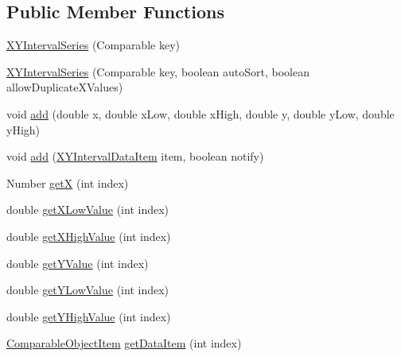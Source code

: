\subsection*{Public Member Functions}
\begin{DoxyCompactItemize}
\item 
\mbox{\hyperlink{classorg_1_1jfree_1_1data_1_1xy_1_1_x_y_interval_series_a13d7c25b678591c336fe3552e7c6fc99}{X\+Y\+Interval\+Series}} (Comparable key)
\item 
\mbox{\hyperlink{classorg_1_1jfree_1_1data_1_1xy_1_1_x_y_interval_series_a0b1ff8ece95aa620538c35f517aa6cbd}{X\+Y\+Interval\+Series}} (Comparable key, boolean auto\+Sort, boolean allow\+Duplicate\+X\+Values)
\item 
void \mbox{\hyperlink{classorg_1_1jfree_1_1data_1_1xy_1_1_x_y_interval_series_a03b07b1832e806978a1e66d51e0981ed}{add}} (double x, double x\+Low, double x\+High, double y, double y\+Low, double y\+High)
\item 
void \mbox{\hyperlink{classorg_1_1jfree_1_1data_1_1xy_1_1_x_y_interval_series_a3af8db8f0c79d077b8024769bb09a37a}{add}} (\mbox{\hyperlink{classorg_1_1jfree_1_1data_1_1xy_1_1_x_y_interval_data_item}{X\+Y\+Interval\+Data\+Item}} item, boolean notify)
\item 
Number \mbox{\hyperlink{classorg_1_1jfree_1_1data_1_1xy_1_1_x_y_interval_series_afd03e2d1068ff8f2021602f034386a22}{getX}} (int index)
\item 
double \mbox{\hyperlink{classorg_1_1jfree_1_1data_1_1xy_1_1_x_y_interval_series_af6db3fe496b93daf9975b76ad3e17edd}{get\+X\+Low\+Value}} (int index)
\item 
double \mbox{\hyperlink{classorg_1_1jfree_1_1data_1_1xy_1_1_x_y_interval_series_aac41d79c55d54ee58dfa8e74215d6e1e}{get\+X\+High\+Value}} (int index)
\item 
double \mbox{\hyperlink{classorg_1_1jfree_1_1data_1_1xy_1_1_x_y_interval_series_aabd5dda6a780aa76ba4fcc3786ff43af}{get\+Y\+Value}} (int index)
\item 
double \mbox{\hyperlink{classorg_1_1jfree_1_1data_1_1xy_1_1_x_y_interval_series_a2bce1a3a6253a0b31d3c08a1af7031b2}{get\+Y\+Low\+Value}} (int index)
\item 
double \mbox{\hyperlink{classorg_1_1jfree_1_1data_1_1xy_1_1_x_y_interval_series_ad7950a8dbdddaa85d002c9c7ccdfd1ab}{get\+Y\+High\+Value}} (int index)
\item 
\mbox{\hyperlink{classorg_1_1jfree_1_1data_1_1_comparable_object_item}{Comparable\+Object\+Item}} \mbox{\hyperlink{classorg_1_1jfree_1_1data_1_1xy_1_1_x_y_interval_series_acf462ce44f7eca2502b5141e609e0e25}{get\+Data\+Item}} (int index)
\end{DoxyCompactItemize}
